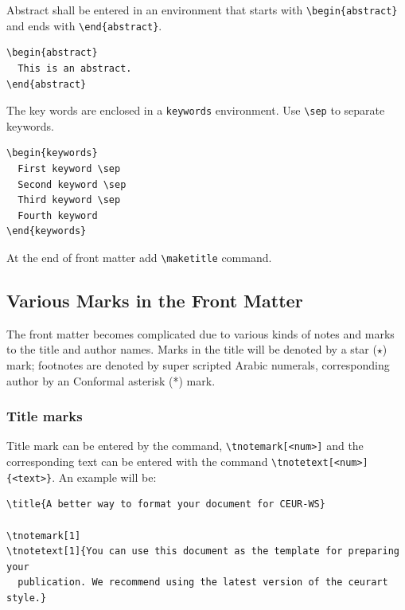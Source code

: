 \documentclass{ceurart}
\begin{document}
Abstract shall be entered in an environment that starts
with \verb|\begin{abstract}| and ends with
\verb|\end{abstract}|. 

\begin{lstlisting}
\begin{abstract}
  This is an abstract.
\end{abstract}
\end{lstlisting}

The key words are enclosed in a \verb|keywords|
environment. Use \verb|\sep| to separate keywords.

\begin{lstlisting}
\begin{keywords}
  First keyword \sep 
  Second keyword \sep 
  Third keyword \sep 
  Fourth keyword
\end{keywords}
\end{lstlisting}

At the end of front matter add \verb|\maketitle| command.

\subsection{Various Marks in the Front Matter}

The front matter becomes complicated due to various kinds
of notes and marks to the title and author names. Marks in
the title will be denoted by a star ($\star$) mark;
footnotes are denoted by super scripted Arabic numerals,
corresponding author by an Conformal asterisk (*) mark.

\subsubsection{Title marks}

Title mark can be entered by the command, \verb|\tnotemark[<num>]|
and the corresponding text can be entered with the command
\verb|\tnotetext[<num>]{<text>}|. An example will be:

\begin{lstlisting}
\title{A better way to format your document for CEUR-WS}

\tnotemark[1]
\tnotetext[1]{You can use this document as the template for preparing your
  publication. We recommend using the latest version of the ceurart style.}
\end{lstlisting}
\end{document}
